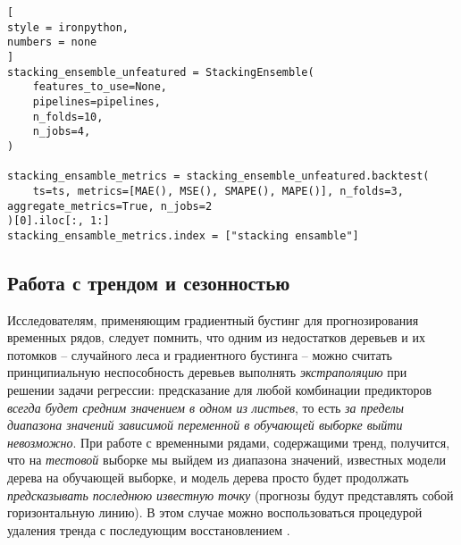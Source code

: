 \documentclass[%
	11pt,
	a4paper,
	utf8,
		]{article}
\begin{document}
\begin{lstlisting}[
style = ironpython,
numbers = none
]
stacking_ensemble_unfeatured = StackingEnsemble(
    features_to_use=None,
    pipelines=pipelines,
    n_folds=10,
    n_jobs=4,
)

stacking_ensamble_metrics = stacking_ensemble_unfeatured.backtest(
    ts=ts, metrics=[MAE(), MSE(), SMAPE(), MAPE()], n_folds=3, aggregate_metrics=True, n_jobs=2
)[0].iloc[:, 1:]
stacking_ensamble_metrics.index = ["stacking ensamble"]
\end{lstlisting}
 
\subsection{Работа с трендом и сезонностью}

Исследователям, применяющим градиентный бустинг для прогнозирования временных рядов, следует помнить, что одним из недостатков деревьев и их потомков -- случайного леса и градиентного бустинга -- можно считать {\color{red}принципиальную неспособность деревьев выполнять \emph{экстраполяцию} при решении задачи регрессии}: предсказание для любой комбинации предикторов \emph{всегда будет средним значением в одном из листьев}, то есть \emph{за пределы диапазона значений зависимой переменной в обучающей выборке выйти невозможно}. При работе с временными рядами, содержащими тренд, получится, что на \emph{тестовой} выборке мы выйдем из диапазона значений, известных модели дерева на обучающей выборке, и модель дерева просто будет продолжать \emph{предсказывать последнюю известную точку} (прогнозы будут представлять собой горизонтальную линию). В этом случае можно воспользоваться процедурой удаления тренда с последующим восстановлением \cite[]{gruzdev:time-series-2022}.
\end{document}
